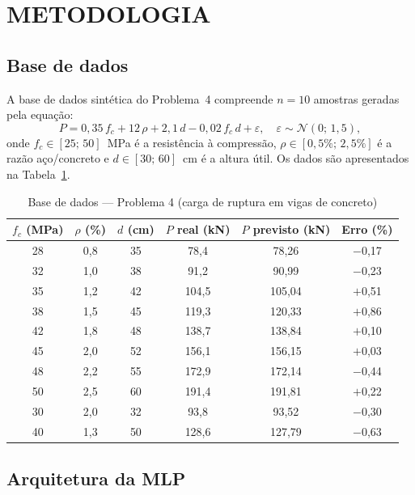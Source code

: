 \documentclass[12pt,fleqn]{article}
\begin{document}
\section{METODOLOGIA}

\subsection{Base de dados}

A base de dados sintética do Problema~4 compreende $n = 10$ amostras geradas pela
equação:
\begin{equation}
  P = 0{,}35\,f_c + 12\,\rho + 2{,}1\,d - 0{,}02\,f_c\,d + \varepsilon,
  \quad \varepsilon \sim \mathcal{N}(0;\,1{,}5),
  \label{eq:modelo}
\end{equation}
onde $f_c \in [25;\,50]$~MPa é a resistência à compressão, $\rho \in
[0{,}5\%;\,2{,}5\%]$ é a razão aço/concreto e $d \in [30;\,60]$~cm é a altura
útil. Os dados são apresentados na Tabela~\ref{tab:dados}.

\begin{table}[H]
\caption{Base de dados --- Problema 4 (carga de ruptura em vigas de concreto)}
\vspace{8pt}
\centering
\begin{tabular*}{\textwidth}{@{\extracolsep{\fill}}cccc|cc}
\toprule
$f_c$ (MPa) & $\rho$ (\%) & $d$ (cm) & $P$ real (kN) &
$P$ previsto (kN) & Erro (\%) \\
\midrule
28  & 0,8 & 35 &  78,4 &  78,26 & $-$0,17 \\
32  & 1,0 & 38 &  91,2 &  90,99 & $-$0,23 \\
35  & 1,2 & 42 & 104,5 & 105,04 &  $+$0,51 \\
38  & 1,5 & 45 & 119,3 & 120,33 &  $+$0,86 \\
42  & 1,8 & 48 & 138,7 & 138,84 &  $+$0,10 \\
45  & 2,0 & 52 & 156,1 & 156,15 &  $+$0,03 \\
48  & 2,2 & 55 & 172,9 & 172,14 & $-$0,44 \\
50  & 2,5 & 60 & 191,4 & 191,81 &  $+$0,22 \\
30  & 2,0 & 32 &  93,8 &  93,52 & $-$0,30 \\
40  & 1,3 & 50 & 128,6 & 127,79 & $-$0,63 \\
\bottomrule
\end{tabular*}
\label{tab:dados}
\end{table}

\subsection{Arquitetura da MLP}
\end{document}
